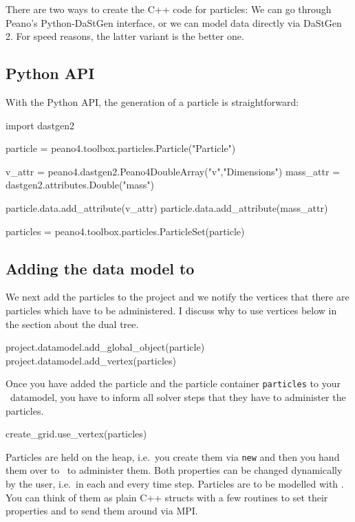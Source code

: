\noindent
There are two ways to create the C++ code for particles: 
We can go through Peano's Python-DaStGen interface, or we can model data
directly via DaStGen 2.
For speed reasons, the latter variant is the better one.



\subsection{Python API}

With the Python API, the generation of a particle is straightforward:

\begin{code}
import dastgen2


particle = peano4.toolbox.particles.Particle("Particle")

v_attr = peano4.dastgen2.Peano4DoubleArray("v","Dimensions")
mass_attr = dastgen2.attributes.Double("mass")

particle.data.add_attribute(v_attr)
particle.data.add_attribute(mass_attr)

particles = peano4.toolbox.particles.ParticleSet(particle)
\end{code}



\subsection{Adding the data model to \Peano}

We next add the particles to the project and we notify the vertices that there 
are particles which have to be administered. 
I discuss why to use vertices below in the section about the dual tree.

\begin{code}
project.datamodel.add_global_object(particle)
project.datamodel.add_vertex(particles)
\end{code}

\noindent
Once you have added the particle and the particle container \texttt{particles}
to your \Peano\ datamodel, you have to inform all solver steps that they have to
administer the particles.

\begin{code}
create_grid.use_vertex(particles)
\end{code}


\noindent
Particles are held on the heap, i.e.~you create them via \texttt{new} and then
you hand them over to \Peano\ to administer them.
Both properties can be changed dynamically by the user, i.e.~in each and every
time step.
Particles are to be modelled with \DaStGen.
You can think of them as plain C++ structs with a few routines to set their
properties and to send them around via MPI.



